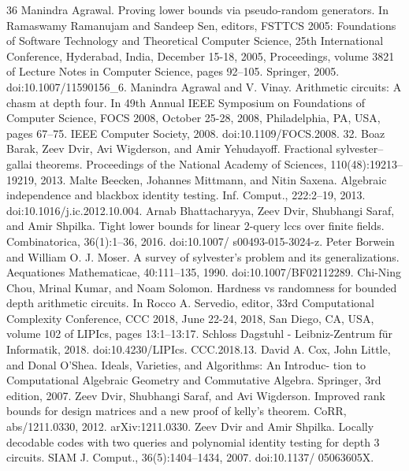 \begin{thebibliography}{36}
Manindra Agrawal. Proving lower bounds via pseudo-random generators. In Ramaswamy Ramanujam and Sandeep Sen, editors, FSTTCS 2005: Foundations of Software Technology and Theoretical Computer Science, 25th International Conference, Hyderabad, India, December 15-18, 2005, Proceedings, volume 3821 of Lecture Notes in Computer Science, pages 92–105. Springer, 2005. doi:10.1007/11590156\_6.
Manindra Agrawal and V. Vinay. Arithmetic circuits: A chasm at depth four. In 49th Annual IEEE Symposium on Foundations of Computer Science, FOCS 2008, October 25-28, 2008, Philadelphia, PA, USA, pages 67–75. IEEE Computer Society, 2008. doi:10.1109/FOCS.2008. 32.
Boaz Barak, Zeev Dvir, Avi Wigderson, and Amir Yehudayoff. Fractional sylvester–gallai theorems. Proceedings of the National Academy of Sciences, 110(48):19213–19219, 2013.
Malte Beecken, Johannes Mittmann, and Nitin Saxena. Algebraic independence and blackbox identity testing. Inf. Comput., 222:2–19, 2013. doi:10.1016/j.ic.2012.10.004.
Arnab Bhattacharyya, Zeev Dvir, Shubhangi Saraf, and Amir Shpilka. Tight lower bounds for linear 2-query lccs over finite fields. Combinatorica, 36(1):1–36, 2016. doi:10.1007/ s00493-015-3024-z.
Peter Borwein and William O. J. Moser. A survey of sylvester’s problem and its generalizations. Aequationes Mathematicae, 40:111–135, 1990. doi:10.1007/BF02112289.
Chi-Ning Chou, Mrinal Kumar, and Noam Solomon. Hardness vs randomness for bounded depth arithmetic circuits. In Rocco A. Servedio, editor, 33rd Computational Complexity Conference, CCC 2018, June 22-24, 2018, San Diego, CA, USA, volume 102 of LIPIcs, pages 13:1–13:17. Schloss Dagstuhl - Leibniz-Zentrum für Informatik, 2018. doi:10.4230/LIPIcs. CCC.2018.13.
David A. Cox, John Little, and Donal O’Shea. Ideals, Varieties, and Algorithms: An Introduc- tion to Computational Algebraic Geometry and Commutative Algebra. Springer, 3rd edition, 2007.
Zeev Dvir, Shubhangi Saraf, and Avi Wigderson. Improved rank bounds for design matrices and a new proof of kelly’s theorem. CoRR, abs/1211.0330, 2012. arXiv:1211.0330.
Zeev Dvir and Amir Shpilka. Locally decodable codes with two queries and polynomial identity testing for depth 3 circuits. SIAM J. Comput., 36(5):1404–1434, 2007. doi:10.1137/ 05063605X.

\end{thebibliography}
